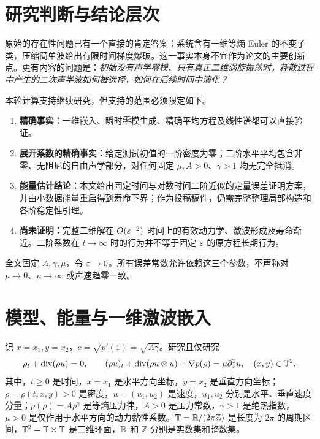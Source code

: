 \section{研究判断与结论层次}

原始的存在性问题已有一个直接的肯定答案：系统含有一维等熵 Euler 的不变子类，压缩简单波给出有限时间梯度爆破。这一事实本身不宜作为论文的主要创新点。更有内容的问题是：\emph{初始没有声学零模、只有真正二维涡旋振荡时，耗散过程中产生的二次声学波如何被选择，如何在后续时间中演化？}

本轮计算支持继续研究，但支持的范围必须限定如下。
\begin{enumerate}
\item \textbf{精确事实：}一维嵌入、瞬时零模生成、精确平均方程及线性谱都可以直接验证。
\item \textbf{展开系数的精确事实：}给定测试初值的一阶密度为零；二阶水平平均包含非零、无阻尼的自由声学部分，对任何固定 $\mu,A>0$、$\gamma>1$ 均无完全抵消。
\item \textbf{能量估计结论：}本文给出固定时间与对数时间二阶近似的定量误差证明方案，并由小数据能量重启得到寿命下界；作为投稿稿件，仍需完整整理局部构造和各阶稳定性引理。
\item \textbf{尚未证明：}完整二维解在 $O(\varepsilon^{-2})$ 时间上的有效动力学、激波形成及寿命渐近。二阶系数在 $t\to\infty$ 时的行为并不等于固定 $\varepsilon$ 的原方程长期行为。
\end{enumerate}
全文固定 $A,\gamma,\mu$，令 $\varepsilon\to0$。所有误差常数允许依赖这三个参数，不声称对 $\mu\to0$、$\mu\to\infty$ 或声速趋零一致。

\section{模型、能量与一维激波嵌入}
记 $x=x_1,y=x_2$，$c=\sqrt{p'(1)}=\sqrt{A\gamma}$。研究且仅研究
\begin{equation}\label{eq:model}
 \rho_t+\operatorname{div}(\rho u)=0,\qquad
 (\rho u)_t+\operatorname{div}(\rho u\otimes u)+\nabla p(\rho)=\mu\partial_x^2u,
 \quad (x,y)\in\mathbb T^2.
\end{equation}
其中，$t\ge0$ 是时间，$x=x_1$ 是水平方向坐标，$y=x_2$ 是垂直方向坐标；$\rho=\rho(t,x,y)>0$ 是密度，$u=(u_1,u_2)$ 是速度，$u_1,u_2$ 分别是水平、垂直速度分量；$p(\rho)=A\rho^\gamma$ 是等熵压力律，$A>0$ 是压力常数，$\gamma>1$ 是绝热指数，$\mu>0$ 是仅作用于水平方向的动力黏性系数。$\mathbb T=\mathbb R/(2\pi\mathbb Z)$ 是长度为 $2\pi$ 的周期区间，$\mathbb T^2=\mathbb T\times\mathbb T$ 是二维环面，$\mathbb R$ 和 $\mathbb Z$ 分别是实数集和整数集。


